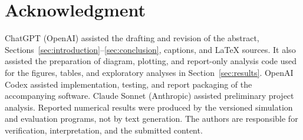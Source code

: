 \section*{Acknowledgment}
ChatGPT (OpenAI) assisted the drafting and revision of the abstract, Sections~\ref{sec:introduction}--\ref{sec:conclusion}, captions, and LaTeX sources. It also assisted the preparation of diagram, plotting, and report-only analysis code used for the figures, tables, and exploratory analyses in Section~\ref{sec:results}. OpenAI Codex assisted implementation, testing, and report packaging of the accompanying software. Claude Sonnet (Anthropic) assisted preliminary project analysis. Reported numerical results were produced by the versioned simulation and evaluation programs, not by text generation. The authors are responsible for verification, interpretation, and the submitted content.
